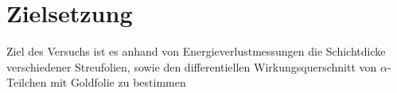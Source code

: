 \section{Zielsetzung}
\label{sec:Zielsetzung}

Ziel des Versuchs ist es anhand von Energieverlustmessungen die Schichtdicke verschiedener Streufolien, sowie den differentiellen Wirkungsquerschnitt von $\alpha$-Teilchen mit Goldfolie zu bestimmen